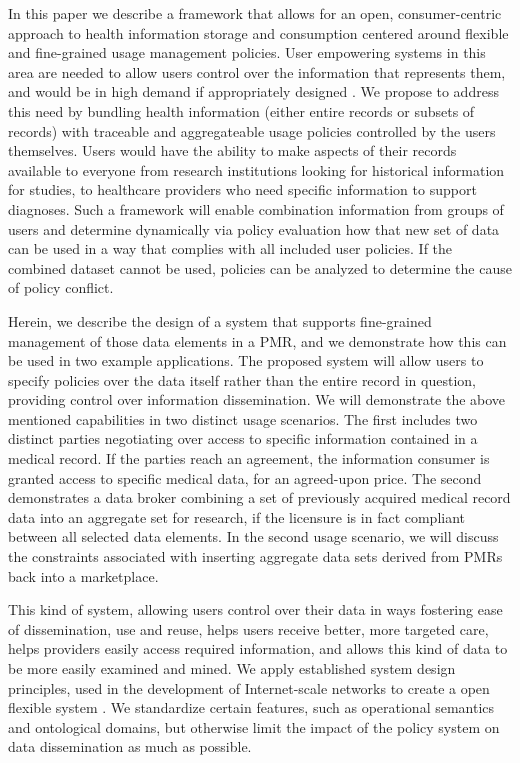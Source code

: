 \documentclass[10pt, conference, compsocconf]{IEEEtran}
\begin{document}
In this paper we describe a framework that allows for an open, consumer-centric approach to health information storage and consumption centered around flexible and fine-grained usage management policies.  User empowering systems in this area are needed to allow users control over the information that represents them, and would be in high demand if appropriately designed \cite{Emr:PyAmWaCr}.  We propose to address this need by bundling health information (either entire records or subsets of records) with traceable and aggregateable usage policies controlled by the users themselves.  Users would have the ability to make aspects of their records available to everyone from research institutions looking for historical information for studies, to healthcare providers who need specific information to support diagnoses.  Such a framework will enable combination information from groups of users and determine dynamically via policy evaluation how that new set of data can be used in a way that complies with all included user policies.  If the combined dataset cannot be used, policies can be analyzed to determine the cause of policy conflict.

Herein, we describe the design of a system that supports fine-grained management of those data elements in a PMR, and we demonstrate how this can be used in two example applications.  The proposed system will allow users to specify policies over the data itself rather than the entire record in question, providing control over information dissemination.  We will demonstrate the above mentioned capabilities in two distinct usage scenarios.  The first includes two distinct parties negotiating over access to specific information contained in a medical record.  If the parties reach an agreement, the information consumer is granted access to specific medical data, for an agreed-upon price.  The second demonstrates a data broker combining a set of previously acquired medical record data into an aggregate set for research, if the licensure is in fact compliant between all selected data elements.  In the second usage scenario, we will discuss the constraints associated with inserting aggregate data sets derived from PMRs back into a marketplace.

This kind of system, allowing users control over their data in ways fostering ease of dissemination, use and reuse, helps users receive better, more targeted care, helps providers easily access required information, and allows this kind of data to be more easily examined and mined.  We apply established system design principles, used in the development of Internet-scale networks to create a open flexible system \cite{Al:04,BlCl:01,ClWrSoBr:02}.  We standardize certain features, such as operational semantics and ontological domains, but otherwise limit the impact of the policy system on data dissemination as much as possible.
\end{document}
